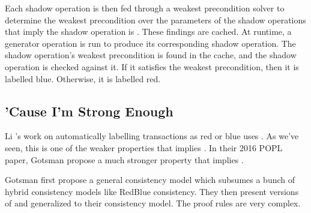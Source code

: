 Each shadow operation is then fed through a weakest precondition solver to
determine the weakest precondition over the parameters of the shadow operations
that imply the shadow operation is \isafe{}. These findings are cached. At
runtime, a generator operation is run to produce its corresponding shadow
operation. The shadow operation's weakest precondition is found in the cache,
and the shadow operation is checked against it. If it satisfies the weakest
precondition, then it is labelled blue. Otherwise, it is labelled red.

\subsection{'Cause I'm Strong Enough}
Li \etal{}'s work on automatically labelling transactions as red or blue uses
\isafety{}. As we've seen, this is one of the weaker properties that implies
\iconfluence{}. In their 2016 POPL paper, Gotsman \etal{} propose a much
stronger property that implies \iconfluence{} \cite{gotsman2016cause}.

Gotsman \etal{} first propose a general consistency model which subsumes a
bunch of hybrid consistency models like RedBlue consistency. They then present
versions of \istrength{} and  \istrengthstar{} generalized to their consistency
model. The proof rules are very complex.
